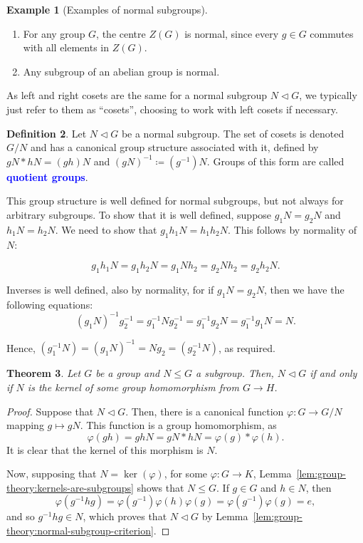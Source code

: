\documentclass[12pt]{report}
\newcommand{\indx}[1]{\index{#1}\textbf{\textcolor{blue}{#1}}}
\renewcommand{\phi}{\varphi}
\newtheorem{theorem}{Theorem}[section] %
\theoremstyle{definition}
\newtheorem{definition}[theorem]{Definition}
\newtheorem{example}[theorem]{Example}
\begin{document}
\begin{example}[Examples of normal subgroups]\label{ex:group-theory:normal-subgroups}
  \begin{enumerate}
  \item For any group \(G\), the centre \(Z(G)\) is normal, since every \(g \in G\) commutes with all elements in \(Z(G)\).
  \item Any subgroup of an abelian group is normal.
  \end{enumerate}
\end{example}

As left and right cosets are the same for a normal subgroup \(N \triangleleft G\), we typically just refer to them as ``cosets'', choosing to work with left cosets if necessary.

\begin{definition}
  \label{def:group-theory:quotient-group}
  Let \(N \triangleleft G\) be a normal subgroup. The set of cosets is denoted \(G / N\) and has a canonical group structure associated with it, defined by \(gN * hN = (gh)N\) and \((gN)^{-1} \coloneqq (g^{-1})N\). Groups of this form are called \indx{quotient groups}.
\end{definition}

This group structure is well defined for normal subgroups, but not always for arbitrary subgroups.
%
To show that it is well defined, suppose \(g_{1}N = g_{2}N\) and \(h_{1}N = h_{2}N\).
%
We need to show that \(g_{1}h_{1}N = h_{1}h_{2}N\).
%
This follows by normality of \(N\):

\[g_{1}h_{1} N = g_{1} h_{2}N =g_{1}Nh_{2} = g_{2}Nh_{2} = g_{2}h_{2}N.\]

Inverses is well defined, also by normality, for if \(g_{1}N = g_{2}N\), then we have the following equations:
\[(g_{1}N)^{-1}g^{-1}_{2} = g_{1}^{-1}Ng^{-1}_{2} = g_{1}^{-1}g_{2}N = g^{-1}_{1}g_{1}N = N.\]

Hence, \((g^{-1}_{1}N) = (g_{1}N)^{-1} = Ng_{2} = (g^{-1}_{2}N)\), as required.


\begin{theorem}
  Let \(G\) be a group and \(N \leq G\) a subgroup.
  Then, \(N \triangleleft G\) if and only if \(N\) is the kernel of some group homomorphism from \(G \to H\).
\end{theorem}

\begin{proof}
  Suppose that \(N \triangleleft G\).
  Then, there is a canonical function \(\phi: G \to G/N\) mapping \(g \mapsto gN\).
  This function is a group homomorphism, as
  \[\phi(gh) = ghN = gN * hN = \phi(g) * \phi(h). \]
  It is clear that the kernel of this morphism is \(N\).

  Now, supposing that \(N = \ker(\phi)\), for some \(\phi : G \to K\), Lemma~\ref{lem:group-theory:kernels-are-subgroups} shows that \(N \leq G\).
  If \(g \in G\) and \(h \in N\), then
  \[\phi(g^{-1}h g) = \phi(g^{-1}) \phi(h) \phi(g) = \phi(g^{-1})\phi(g) = e,\]
  and so \(g^{-1}h g \in N\), which proves that \(N \triangleleft G\) by Lemma~\ref{lem:group-theory:normal-subgroup-criterion}.
\end{proof}
\end{document}
